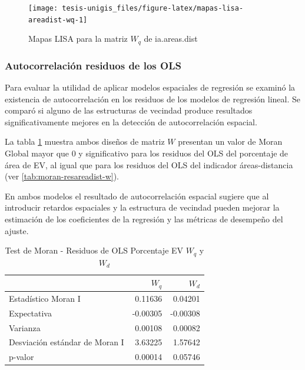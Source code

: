 \documentclass[12pt,a4paper,openany]{book}
\theoremstyle{definition}
\theoremstyle{definition}
\theoremstyle{definition}
\theoremstyle{remark}
\begin{document}
\begin{figure}

{\centering \texttt{[image: tesis-unigis\_files/figure-latex/mapas-lisa-areadist-wq-1]} 

}

\caption{Mapas LISA para la matriz $W_q$ de ia.areas.dist}\label{fig:mapas-lisa-areadist-wq}
\end{figure}

\subsubsection{Autocorrelación residuos de los
OLS}\label{autocorrelacion-residuos-de-los-ols-1}

Para evaluar la utilidad de aplicar modelos espaciales de regresión se
examinó la existencia de autocorrelación en los residuos de los modelos
de regresión lineal. Se comparó si alguno de las estructuras de vecindad
produce resultados significativamente mejores en la detección de
autocorrelación espacial.

La tabla \ref{tab:moran-resareaep-w} muestra ambos diseños de matriz
\(W\) presentan un valor de Moran Global mayor que 0 y significativo
para los residuos del OLS del porcentaje de área de EV, al igual que
para los residuos del OLS del indicador áreas-distancia (ver
\ref{tab:moran-resareadist-w}).

En ambos modelos el resultado de autocorrelación espacial sugiere que al
introducir retardos espaciales y la estructura de vecindad pueden
mejorar la estimación de los coeficientes de la regresión y las métricas
de desempeño del ajuste.

\begin{table}[t]

\caption{\label{tab:moran-resareaep-w}Test de Moran - Residuos de OLS Porcentaje EV $W_q$ y $W_d$}
\centering
\begin{tabular}{lrr}
\toprule
  & $W_q$ & $W_d$\\
\midrule
Estadístico Moran I & 0.11636 & 0.04201\\
Expectativa & -0.00305 & -0.00308\\
Varianza & 0.00108 & 0.00082\\
Desviación estándar de Moran I & 3.63225 & 1.57642\\
p-valor & 0.00014 & 0.05746\\
\bottomrule
\end{tabular}
\end{table}
\end{document}

